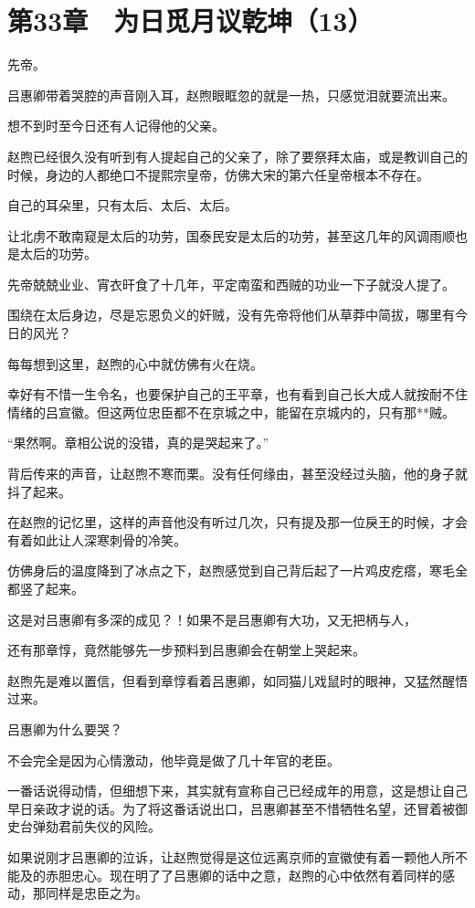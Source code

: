 \section{第33章　为日觅月议乾坤（13）}

先帝。

吕惠卿带着哭腔的声音刚入耳，赵煦眼眶忽的就是一热，只感觉泪就要流出来。

想不到时至今日还有人记得他的父亲。

赵煦已经很久没有听到有人提起自己的父亲了，除了要祭拜太庙，或是教训自己的时候，身边的人都绝口不提熙宗皇帝，仿佛大宋的第六任皇帝根本不存在。

自己的耳朵里，只有太后、太后、太后。

让北虏不敢南窥是太后的功劳，国泰民安是太后的功劳，甚至这几年的风调雨顺也是太后的功劳。

先帝兢兢业业、宵衣旰食了十几年，平定南蛮和西贼的功业一下子就没人提了。

围绕在太后身边，尽是忘恩负义的奸贼，没有先帝将他们从草莽中简拔，哪里有今日的风光？

每每想到这里，赵煦的心中就仿佛有火在烧。

幸好有不惜一生令名，也要保护自己的王平章，也有看到自己长大成人就按耐不住情绪的吕宣徽。但这两位忠臣都不在京城之中，能留在京城内的，只有那**贼。

“果然啊。章相公说的没错，真的是哭起来了。”

背后传来的声音，让赵煦不寒而栗。没有任何缘由，甚至没经过头脑，他的身子就抖了起来。

在赵煦的记忆里，这样的声音他没有听过几次，只有提及那一位戾王的时候，才会有着如此让人深寒刺骨的冷笑。

仿佛身后的温度降到了冰点之下，赵煦感觉到自己背后起了一片鸡皮疙瘩，寒毛全都竖了起来。

这是对吕惠卿有多深的成见？！如果不是吕惠卿有大功，又无把柄与人，

还有那章惇，竟然能够先一步预料到吕惠卿会在朝堂上哭起来。

赵煦先是难以置信，但看到章惇看着吕惠卿，如同猫儿戏鼠时的眼神，又猛然醒悟过来。

吕惠卿为什么要哭？

不会完全是因为心情激动，他毕竟是做了几十年官的老臣。

一番话说得动情，但细想下来，其实就有宣称自己已经成年的用意，这是想让自己早日亲政才说的话。为了将这番话说出口，吕惠卿甚至不惜牺牲名望，还冒着被御史台弹劾君前失仪的风险。

如果说刚才吕惠卿的泣诉，让赵煦觉得是这位远离京师的宣徽使有着一颗他人所不能及的赤胆忠心。现在明了了吕惠卿的话中之意，赵煦的心中依然有着同样的感动，那同样是忠臣之为。

